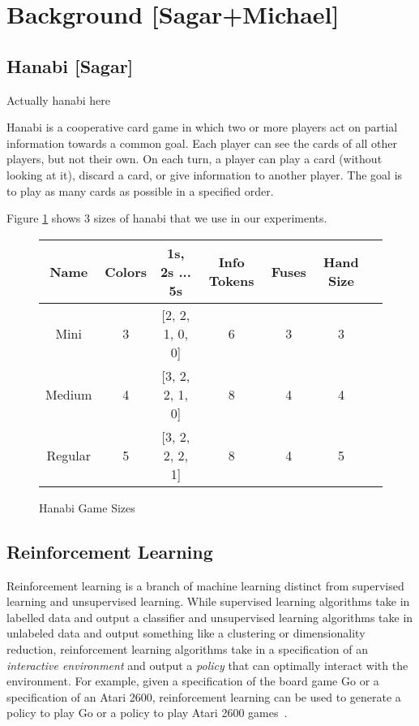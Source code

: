 \section{Background [Sagar+Michael]}\label{sec:background}

\subsection{Hanabi [Sagar]}
Actually hanabi here

Hanabi \cite{hanabiboardgame, hanabiwiki} is a cooperative card game in which two or more players act on partial information towards a common goal. Each player can see the cards of all other players, but not their own. On each turn, a player can play a card (without looking at it), discard a card, or give information to another player. The goal is to play as many cards as possible in a specified order.

Figure \ref{fig:hanabisizes} shows 3 sizes of hanabi that we use in our experiments.

\begin{figure}
    \centering
    \begin{tabular}{|c | c | c | c | c | c | c |} \hline
        Name        & Colors & 1s, 2s ... 5s  & Info Tokens & Fuses & Hand Size \\ \hline
        Mini        & 3      & [2, 2, 1, 0, 0]    & 6           & 3     & 3 \\ \hline
        Medium      & 4      & [3, 2, 2, 1, 0] & 8           & 4     & 4 \\ \hline
        Regular     & 5      & [3, 2, 2, 2, 1] & 8 & 4 & 5 \\ \hline
    \end{tabular}
    \caption{Hanabi Game Sizes}
    \label{fig:hanabisizes}
\end{figure}

\subsection{Reinforcement Learning}
Reinforcement learning is a branch of machine learning distinct from supervised
learning and unsupervised learning. While supervised learning algorithms take
in labelled data and output a classifier and unsupervised learning algorithms
take in unlabeled data and output something like a clustering or
dimensionality reduction, reinforcement learning algorithms take in a
specification of an \emph{interactive environment} and output a \emph{policy}
that can optimally interact with the environment. For example, given a
specification of the board game Go or a specification of an Atari 2600,
reinforcement learning can be used to generate a policy to play Go or a policy
to play Atari 2600 games~\cite{silver2016mastering,mnih2015human}.

